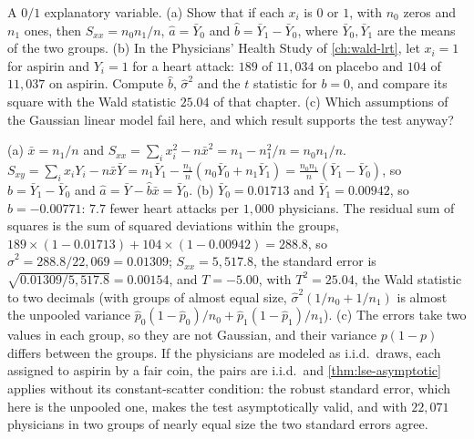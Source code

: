 \begin{exercise}
\label{ex:reg-aspirin}
A $0/1$ explanatory variable. (a) Show that if each $x_i$ is $0$ or $1$, with $n_0$ zeros and $n_1$ ones, then $S_{xx} = n_0n_1/n$, $\hat{a} = \bar{Y}_0$ and $\hat{b} = \bar{Y}_1 - \bar{Y}_0$, where $\bar{Y}_0, \bar{Y}_1$ are the means of the two groups. (b) In the Physicians' Health Study of \cref{ch:wald-lrt}, let $x_i = 1$ for aspirin and $Y_i = 1$ for a heart attack: $189$ of $11{,}034$ on placebo and $104$ of $11{,}037$ on aspirin. Compute $\hat{b}$, $\hat{\sigma}^2$ and the $t$ statistic for $b = 0$, and compare its square with the Wald statistic $25.04$ of that chapter. (c) Which assumptions of the Gaussian linear model fail here, and which result supports the test anyway?
\end{exercise}
\begin{solution}
(a) $\bar{x} = n_1/n$ and $S_{xx} = \sum_i x_i^2 - n\bar{x}^2 = n_1 - n_1^2/n = n_0n_1/n$. $S_{xy} = \sum_i x_iY_i - n\bar{x}\bar{Y} = n_1\bar{Y}_1 - \frac{n_1}{n}(n_0\bar{Y}_0 + n_1\bar{Y}_1) = \frac{n_0n_1}{n}(\bar{Y}_1 - \bar{Y}_0)$, so $\hat{b} = \bar{Y}_1 - \bar{Y}_0$ and $\hat{a} = \bar{Y} - \hat{b}\bar{x} = \bar{Y}_0$. (b) $\bar{Y}_0 = 0.01713$ and $\bar{Y}_1 = 0.00942$, so $\hat{b} = -0.00771$: $7.7$ fewer heart attacks per $1{,}000$ physicians. The residual sum of squares is the sum of squared deviations within the groups, $189 \times (1 - 0.01713) + 104 \times (1 - 0.00942) = 288.8$, so $\hat{\sigma}^2 = 288.8/22{,}069 = 0.01309$; $S_{xx} = 5{,}517.8$, the standard error is $\sqrt{0.01309/5{,}517.8} = 0.00154$, and $T = -5.00$, with $T^2 = 25.04$, the Wald statistic to two decimals (with groups of almost equal size, $\hat{\sigma}^2(1/n_0 + 1/n_1)$ is almost the unpooled variance $\hat{p}_0(1 - \hat{p}_0)/n_0 + \hat{p}_1(1 - \hat{p}_1)/n_1$). (c) The errors take two values in each group, so they are not Gaussian, and their variance $p(1 - p)$ differs between the groups. If the physicians are modeled as i.i.d.\ draws, each assigned to aspirin by a fair coin, the pairs are i.i.d.\ and \cref{thm:lse-asymptotic} applies without its constant-scatter condition: the robust standard error, which here is the unpooled one, makes the test asymptotically valid, and with $22{,}071$ physicians in two groups of nearly equal size the two standard errors agree.
\end{solution}

